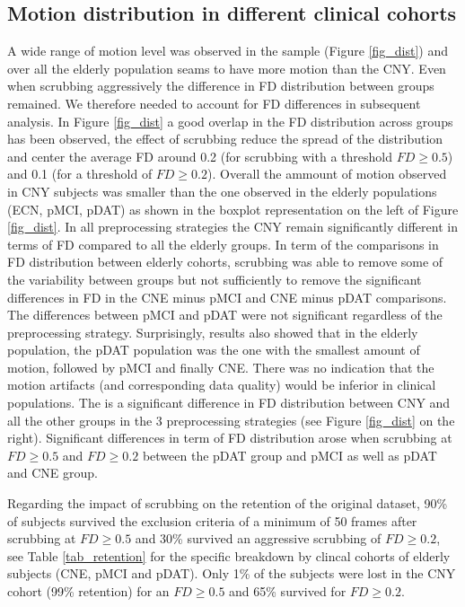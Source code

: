 \subsection{Motion distribution in different clinical cohorts}
A wide range of motion level was observed in the sample (Figure \ref{fig_dist}) and over all the elderly population seams to have more motion than the CNY. Even when scrubbing aggressively the difference in FD distribution between groups remained. We therefore needed to account for FD differences in subsequent analysis. In Figure \ref{fig_dist} a good overlap in the FD distribution across groups has been observed, the effect of scrubbing reduce the spread of the distribution and center the average FD around 0.2 (for scrubbing with a threshold $FD\geq0.5$) and 0.1 (for a threshold of $FD\geq0.2$). Overall the ammount of motion observed in CNY subjects was smaller than the one observed in the elderly populations (ECN, pMCI, pDAT) as shown in the boxplot representation on the left of Figure \ref{fig_dist}. In all preprocessing strategies the CNY remain significantly different in terms of FD compared to all the elderly groups. In term of the comparisons in FD distribution between elderly cohorts, scrubbing was 
able to remove some of the variability between groups but not 
sufficiently to remove the significant differences in FD in the CNE minus pMCI and CNE minus pDAT comparisons. The differences between pMCI and pDAT were not significant regardless of the preprocessing strategy. Surprisingly, results also showed that in the elderly population, the pDAT population was the one with the smallest amount of motion, followed by pMCI and finally CNE. There was no indication that the motion artifacts (and corresponding data quality) would be inferior in clinical populations. The is a 
significant difference in FD distribution between CNY and all the other groups in the 3 preprocessing strategies (see Figure \ref{fig_dist} on the right). Significant differences in term of FD distribution arose when scrubbing at $FD\geq0.5$ and $FD\geq0.2$ between the pDAT group and pMCI as well as pDAT and CNE group.
\par
Regarding the impact of scrubbing on the retention of the original dataset, 90\% of subjects survived the exclusion criteria of a minimum of 50 frames after scrubbing at $FD\geq0.5$ and 30\% survived an aggressive scrubbing of $FD\geq0.2$, see Table \ref{tab_retention} for the specific breakdown by clincal cohorts of elderly subjects (CNE, pMCI and pDAT). Only 1\% of the subjects were lost in the CNY cohort (99\% retention) for an $FD\geq0.5$ and 65\% survived for $FD\geq0.2$.

